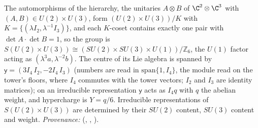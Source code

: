 The automorphisms of the hierarchy, the unitaries $A \otimes B$ of $\C^{2} \otimes \C^{3}$ with $(A, B) \in U(2) \times U(3)$, form $(U(2) \times U(3))/K$ with $K = \{(\lambda I_{2}, \lambda^{-1}I_{3})\}$, and each $K$-coset contains exactly one pair with $\det A \cdot \det B = 1$, so the group is $S(U(2) \times U(3)) \cong (SU(2) \times SU(3) \times U(1))/\mathbb{Z}_{6}$, the $U(1)$ factor acting as $(\lambda^{3}a, \lambda^{-2}b)$. The centre of its Lie algebra is spanned by $\mathsf{y} = (3I_{4}\,I_{2}, -2I_{4}\,I_{3})$ (numbers are read in $\mathrm{span}\{1, I_{4}\}$, the module read on the tower's floors, where $I_{4}$ commutes with the tower vectors; $I_{2}$ and $I_{3}$ are identity matrices); on an irreducible representation $\mathsf{y}$ acts as $I_{4}q$ with $q$ the abelian weight, and hypercharge is $Y = q/6$. Irreducible representations of $S(U(2) \times U(3))$ are determined by their $SU(2)$ content, $SU(3)$ content and weight. \emph{Provenance:} \cite[Thms.~4.1, 4.2, and the definition before Prop.~5.3]{ButlerT12} (, , ).
